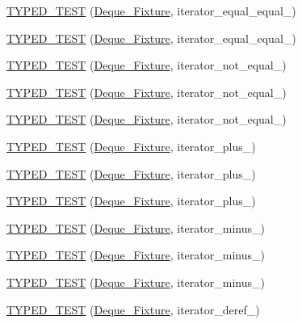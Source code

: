 \begin{DoxyCompactItemize}
\hyperlink{TestDeque_8c_09_09_a59268ae8a73f500d656d717efa27d411}{T\-Y\-P\-E\-D\-\_\-\-T\-E\-S\-T} (\hyperlink{structDeque__Fixture}{Deque\-\_\-\-Fixture}, iterator\-\_\-equal\-\_\-equal\-\_)
\item 
\hyperlink{TestDeque_8c_09_09_abcc8502a85a5a6c92dc4825852c68cc0}{T\-Y\-P\-E\-D\-\_\-\-T\-E\-S\-T} (\hyperlink{structDeque__Fixture}{Deque\-\_\-\-Fixture}, iterator\-\_\-equal\-\_\-equal\-\_)
\item 
\hyperlink{TestDeque_8c_09_09_a3d87b5ec97bb82d54ead0edb293b761f}{T\-Y\-P\-E\-D\-\_\-\-T\-E\-S\-T} (\hyperlink{structDeque__Fixture}{Deque\-\_\-\-Fixture}, iterator\-\_\-not\-\_\-equal\-\_)
\item 
\hyperlink{TestDeque_8c_09_09_a75d83dc8e8f0d35dee69da3de6ac378c}{T\-Y\-P\-E\-D\-\_\-\-T\-E\-S\-T} (\hyperlink{structDeque__Fixture}{Deque\-\_\-\-Fixture}, iterator\-\_\-not\-\_\-equal\-\_)
\item 
\hyperlink{TestDeque_8c_09_09_a298fd05aa3f567c3067ed39935b0d4f3}{T\-Y\-P\-E\-D\-\_\-\-T\-E\-S\-T} (\hyperlink{structDeque__Fixture}{Deque\-\_\-\-Fixture}, iterator\-\_\-not\-\_\-equal\-\_)
\item 
\hyperlink{TestDeque_8c_09_09_a77f7449b7d9e602772a5b24988052afa}{T\-Y\-P\-E\-D\-\_\-\-T\-E\-S\-T} (\hyperlink{structDeque__Fixture}{Deque\-\_\-\-Fixture}, iterator\-\_\-plus\-\_)
\item 
\hyperlink{TestDeque_8c_09_09_a586fe52549c612a1009195fe872ca863}{T\-Y\-P\-E\-D\-\_\-\-T\-E\-S\-T} (\hyperlink{structDeque__Fixture}{Deque\-\_\-\-Fixture}, iterator\-\_\-plus\-\_)
\item 
\hyperlink{TestDeque_8c_09_09_ae50f81c832ecfd5de851c9fb986b08a6}{T\-Y\-P\-E\-D\-\_\-\-T\-E\-S\-T} (\hyperlink{structDeque__Fixture}{Deque\-\_\-\-Fixture}, iterator\-\_\-plus\-\_)
\item 
\hyperlink{TestDeque_8c_09_09_aac6e2e2ac28aafd577f52c981b825f73}{T\-Y\-P\-E\-D\-\_\-\-T\-E\-S\-T} (\hyperlink{structDeque__Fixture}{Deque\-\_\-\-Fixture}, iterator\-\_\-minus\-\_)
\item 
\hyperlink{TestDeque_8c_09_09_afcb72a5e5e3e1346295f700ca4228175}{T\-Y\-P\-E\-D\-\_\-\-T\-E\-S\-T} (\hyperlink{structDeque__Fixture}{Deque\-\_\-\-Fixture}, iterator\-\_\-minus\-\_)
\item 
\hyperlink{TestDeque_8c_09_09_ab0a408307701caf0f9459d604c03d015}{T\-Y\-P\-E\-D\-\_\-\-T\-E\-S\-T} (\hyperlink{structDeque__Fixture}{Deque\-\_\-\-Fixture}, iterator\-\_\-minus\-\_)
\item 
\hyperlink{TestDeque_8c_09_09_ac4568565eead13035f27495dd48fc0e6}{T\-Y\-P\-E\-D\-\_\-\-T\-E\-S\-T} (\hyperlink{structDeque__Fixture}{Deque\-\_\-\-Fixture}, iterator\-\_\-deref\-\_)

\end{DoxyCompactItemize}
